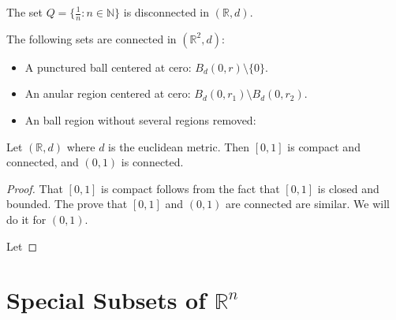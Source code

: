 \documentclass[
	fontsize=10pt, %
	twoside=false, %
	secnumdepth=1, %
]{kaobook}
\begin{document}
\begin{example}
The set $Q=\{\frac{1}{n}:n\in\mathbb{N}\}$ is disconnected in $(\mathbb{R},d).$
\end{example}

\begin{example}
The following sets are connected in $(\mathbb{R}^2,d):$

\begin{itemize}
\item A punctured ball centered at cero: $B_d(0,r)\setminus\{0\}.$

\item An anular region centered at cero: $B_d(0,r_1)\setminus B_d(0,r_2).$

\item An ball region without several regions removed:
\end{itemize}
\end{example}

\begin{theorem}
Let $(\mathbb{R},d)$ where $d$ is the euclidean metric. Then $[0,1]$ is compact and connected, and $(0,1)$ is connected.
\end{theorem}

\begin{proof}
That $[0,1]$ is compact follows from the fact that $[0,1]$ is closed and bounded. The prove that $[0,1]$ and $(0,1)$ are connected are similar. We will do it for $(0,1).$

Let 
\end{proof}

\section{Special Subsets of $\mathbb{R}^n$}
%
%
%


\end{document}
